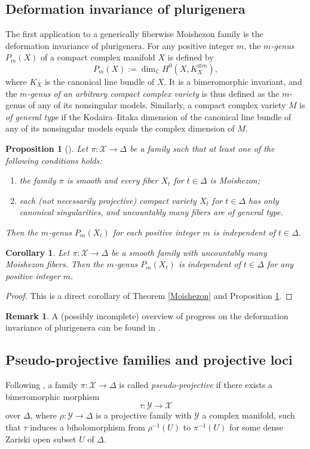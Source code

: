 \documentclass[11pt]{amsart}
\numberwithin{equation}{section}
\theoremstyle{plain}
\newtheorem{prop}[thm]{Proposition}
\newtheorem{cor}[thm]{Corollary}
\theoremstyle{definition}
\newtheorem{rem}[thm]{Remark}
\newcommand{\cX}{\mathcal X}
\begin{document}
\subsection{Deformation invariance of plurigenera}
The first application to a generically fiberwise Moishezon family is the deformation invariance of plurigenera.
For any positive integer $m$,
the \emph{$m$-genus} $P_{m}(X)$ of a compact complex manifold $X$ is defined by
$$P_{m}(X):= \dim_{\mathbb{C}}H^{0}(X,K_{X}^{\otimes{m}}),$$
where $K_{X}$ is the canonical line bundle of $X$.
It is a bimeromorphic invariant, and the \emph{$m$-genus of an arbitrary compact complex variety} is thus defined as the $m$-genus of any of its nonsingular models.
Similarly, a compact complex variety $M$ is \emph{of general type} if the Kodaira--Iitaka dimension of the canonical line bundle of any of its nonsingular models equals the complex dimension of $M$.
\begin{prop}[{\cite[Main Theorem 1.2]{RT22}}]\label{genus}
Let $\pi: \mathcal{X}\rightarrow\Delta$ be a family such that at least one of the following conditions holds:
\begin{enumerate}[$(i)$]
\item the family $\pi$ is smooth and every fiber $X_{t}$ for $t\in\Delta$ is Moishezon;
\item each (not necessarily projective) compact variety $X_{t}$ for $t\in\Delta$ has only canonical singularities, and uncountably many fibers are of general type.
\end{enumerate}
Then the \emph{$m$-genus} $P_{m}(X_{t})$ for each positive integer $m$ is independent of $t\in\Delta$.
\end{prop}

\begin{cor}
Let $\pi: \cX\rightarrow\Delta$ be a smooth family with uncountably many Moishezon fibers.  Then the $m$-genus $P_{m}(X_{t})$ is independent of $t\in\Delta$ for any positive integer $m$.
\end{cor}
\begin{proof}
This is a direct corollary of Theorem \ref{Moishezon} and Proposition \ref{genus}.
\end{proof}
\begin{rem}
A (possibly incomplete) overview of progress on the deformation invariance of plurigenera can be found in \cite[Introduction]{RT22}.
\end{rem}

\subsection{Pseudo-projective families and projective loci}
Following \cite[Definition 4.28]{RT22}, a family $\pi: \mathcal{X}\rightarrow\Delta$ is called \emph{pseudo-projective} if there exists a bimeromorphic morphism
$$\tau: \mathcal{Y}\rightarrow \cX$$
over $\Delta$, where $\rho: \mathcal{Y}\rightarrow \Delta$ is a projective family with $\mathcal{Y}$ a complex manifold, such that $\tau$ induces a biholomorphism from $\rho^{-1}(U)$ to $\pi^{-1}(U)$ for some dense Zariski open subset $U$ of $\Delta$.
\end{document}
